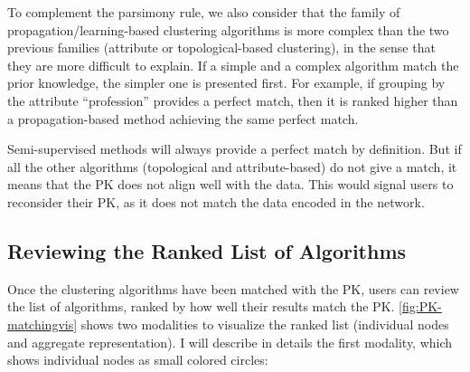 To complement the parsimony rule, we also consider that the family of propagation/learning-based clustering algorithms is more complex than the two previous families (attribute or topological-based clustering), in the sense that they are more difficult to explain.
If a simple and a complex algorithm match the prior knowledge, the simpler one is presented first. For example, if grouping by the attribute ``profession'' provides a perfect match, then it is ranked higher than a propagation-based method achieving the same perfect match.

Semi-supervised methods will always provide a perfect match by definition. But if all the other algorithms (topological and attribute-based) do not give a match, it means that the PK does not align well with the data. This would signal users to reconsider their PK, as it does not match the data encoded in the network.

\subsection{Reviewing the Ranked List of Algorithms}


Once the clustering algorithms have been matched with the PK, users can review the list of algorithms, ranked by how well their results match the PK.
\autoref{fig:PK-matchingvis} shows two modalities to visualize the ranked list (individual nodes and aggregate representation).
I will describe in details the first modality, which shows individual nodes as small colored circles:

%


